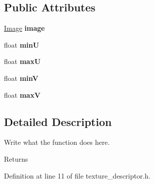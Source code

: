\subsection*{Public Attributes}
\begin{DoxyCompactItemize}
\item 
\hypertarget{structTextureDescriptor_a0cafe348fe84771a83d29330224a99f7}{\hyperlink{classImage}{Image} {\bfseries image}}\label{structTextureDescriptor_a0cafe348fe84771a83d29330224a99f7}

\item 
\hypertarget{structTextureDescriptor_a01a1eecc6d3a37e9dc47c4b660093e21}{float {\bfseries min\+U}}\label{structTextureDescriptor_a01a1eecc6d3a37e9dc47c4b660093e21}

\item 
\hypertarget{structTextureDescriptor_a9409e0cf7f7a82116311e53223587a40}{float {\bfseries max\+U}}\label{structTextureDescriptor_a9409e0cf7f7a82116311e53223587a40}

\item 
\hypertarget{structTextureDescriptor_a8cd78b8d1bbb63ada5b71af81b7faf6a}{float {\bfseries min\+V}}\label{structTextureDescriptor_a8cd78b8d1bbb63ada5b71af81b7faf6a}

\item 
\hypertarget{structTextureDescriptor_abd34635c386508ecca180818b20bfb78}{float {\bfseries max\+V}}\label{structTextureDescriptor_abd34635c386508ecca180818b20bfb78}

\end{DoxyCompactItemize}


\subsection{Detailed Description}
Write what the function does here. 

\begin{DoxyReturn}{Returns}

\end{DoxyReturn}


Definition at line 11 of file texture\+\_\+descriptor.\+h.



